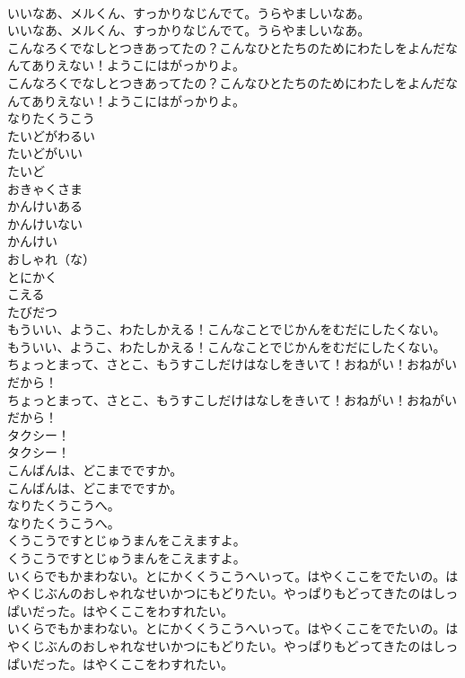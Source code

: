 \documentclass[8pt]{extreport}
\begin{document}
\begin{CJK}{UTF8}{min}
\\	いいなあ、メルくん、すっかりなじんでて。うらやましいなあ。
\\	いいなあ、メルくん、すっかりなじんでて。うらやましいなあ。
\\	こんなろくでなしとつきあってたの？こんなひとたちのためにわたしをよんだなんてありえない！ようこにはがっかりよ。
\\	こんなろくでなしとつきあってたの？こんなひとたちのためにわたしをよんだなんてありえない！ようこにはがっかりよ。
\\	なりたくうこう
\\	たいどがわるい
\\	たいどがいい
\\	たいど
\\	おきゃくさま
\\	かんけいある
\\	かんけいない
\\	かんけい
\\	おしゃれ（な）
\\	とにかく
\\	こえる
\\	たびだつ
\\	もういい、ようこ、わたしかえる！こんなことでじかんをむだにしたくない。
\\	もういい、ようこ、わたしかえる！こんなことでじかんをむだにしたくない。
\\	ちょっとまって、さとこ、もうすこしだけはなしをきいて！おねがい！おねがいだから！
\\	ちょっとまって、さとこ、もうすこしだけはなしをきいて！おねがい！おねがいだから！
\\	タクシー！
\\	タクシー！
\\	こんばんは、どこまでですか。
\\	こんばんは、どこまでですか。
\\	なりたくうこうへ。
\\	なりたくうこうへ。
\\	くうこうですとじゅうまんをこえますよ。
\\	くうこうですとじゅうまんをこえますよ。
\\	いくらでもかまわない。とにかくくうこうへいって。はやくここをでたいの。はやくじぶんのおしゃれなせいかつにもどりたい。やっぱりもどってきたのはしっぱいだった。はやくここをわすれたい。
\\	いくらでもかまわない。とにかくくうこうへいって。はやくここをでたいの。はやくじぶんのおしゃれなせいかつにもどりたい。やっぱりもどってきたのはしっぱいだった。はやくここをわすれたい。

\end{CJK}
\end{document}
